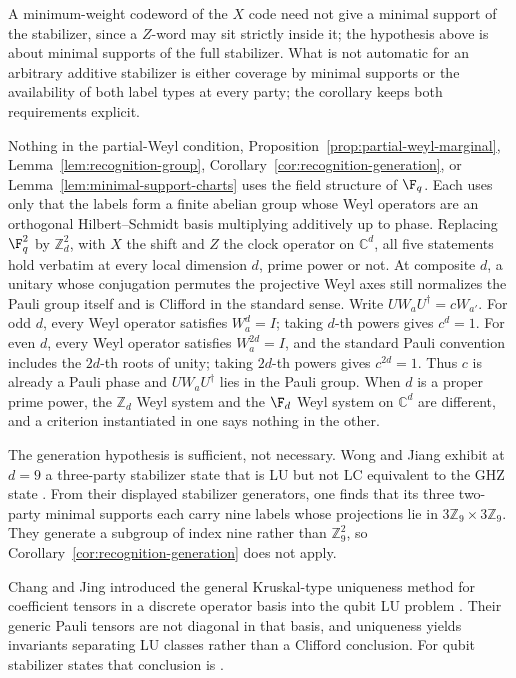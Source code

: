 A minimum-weight codeword of the \(X\) code need not give a minimal support
of the stabilizer, since a \(Z\)-word may sit strictly inside it; the
hypothesis above is about minimal supports of the full stabilizer.  What is
not automatic for an arbitrary additive stabilizer is either coverage by
minimal supports or the availability of both label types at every party;
the corollary keeps both requirements explicit.

\begin{remark}\label{rem:arbitrary-dimension}
Nothing in the partial-Weyl condition,
Proposition~\ref{prop:partial-weyl-marginal},
Lemma~\ref{lem:recognition-group},
Corollary~\ref{cor:recognition-generation}, or
Lemma~\ref{lem:minimal-support-charts} uses the field structure of
\(\F_q\).  Each uses only that the labels form a finite abelian group whose
Weyl operators are an orthogonal Hilbert--Schmidt basis multiplying
additively up to phase.  Replacing \(\F_q^2\) by \(\mathbb Z_d^2\), with
\(X\) the shift and \(Z\) the clock operator on \(\mathbb C^d\), all five
statements hold verbatim at every local dimension \(d\), prime power or
not.  At composite \(d\), a unitary whose conjugation permutes the
projective Weyl axes still normalizes the Pauli group itself and is
Clifford in the standard sense.  Write \(UW_aU^\dagger=cW_{a'}\).  For
odd \(d\), every Weyl operator satisfies \(W_a^d=I\); taking \(d\)-th powers
gives \(c^d=1\).  For even \(d\), every Weyl operator satisfies
\(W_a^{2d}=I\), and the standard Pauli convention includes the \(2d\)-th
roots of unity; taking \(2d\)-th powers gives \(c^{2d}=1\).  Thus \(c\) is
already a Pauli phase and \(UW_aU^\dagger\) lies in the Pauli group.  When
\(d\) is a proper prime power, the
\(\mathbb Z_d\) Weyl system and the \(\F_d\) Weyl system on \(\mathbb C^d\)
are different, and a criterion instantiated in one says nothing in the
other.
\end{remark}

The generation hypothesis is sufficient, not necessary.  Wong and Jiang
exhibit at \(d=9\) a three-party stabilizer state that is LU but not LC
equivalent to the GHZ state \cite{WongJiang2025}.  From their displayed
stabilizer generators, one finds that its three two-party minimal supports
each carry nine labels whose projections lie in
\(3\mathbb Z_9\times3\mathbb Z_9\).  They generate a subgroup of index
nine rather than \(\mathbb Z_9^2\), so
Corollary~\ref{cor:recognition-generation} does not apply.

Chang and Jing introduced the general Kruskal-type uniqueness method for
coefficient tensors in a discrete operator basis into the qubit LU problem
\cite{ChangJing2022}.  Their generic Pauli tensors are not diagonal in that
basis, and uniqueness yields invariants separating LU classes rather than a
Clifford conclusion.  For qubit stabilizer states that conclusion is
\cite[Theorem~1]{VanDenNestDehaeneDeMoor2005}.
